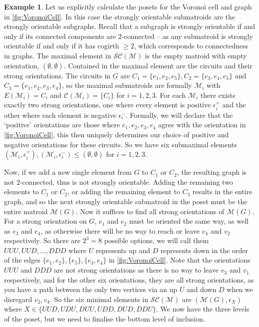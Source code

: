 \documentclass[12pt]{report}
\theoremstyle{definition}
\newtheorem{example}[theorem]{Example}
\def\calC{\mathcal C}
\def\calM{\mathcal M}
\def\calS{\mathcal S}
\theoremstyle{upright}
\begin{document}
\begin{example}

    Let us explicitly calculate the posets for the Voronoi cell and graph in \cref{fig:VoronoiCell}.
    In this case the strongly orientable submatroids are the strongly orientable subgraphs.
    Recall that a subgraph is strongly orientable if and only if its connected components are 2-connected -- as any submatroid is strongly orientable if and only if it has cogirth $\geq2$, which corresponds to connectedness in graphs.
    The maximal element in $\calS\calC(\calM)$ is the empty matroid with empty orientation, $(\emptyset, \emptyset)$.
    Contained in the maximal element are the circuits and their strong orientations.
    The circuits in $G$ are $C_1=\{e_1, e_2, e_5\}, C_2=\{e_3, e_4, e_5\}$ and $C_3=\{e_1, e_2, e_3, e_4\}$, so the maximal submatroids are formally $\calM_i$ with $E(\calM_i)=C_i$ and $\calC(\calM_i)=\{C_i\}$ for $i=1, 2, 3$.
    For each $\calM_i$ there exists exactly two strong orientations, one where every element is positive $\epsilon_i^+$ and the other where each element is negative $\epsilon_i^-$.
    Formally, we will declare that the `positive' orientations are those where $e_1, e_2, e_3, e_4$ agree with the orientation in \cref{fig:VoronoiCell}, this then uniquely determines our choice of positive and negative orientations for these circuits.
    So we have six submaximal elements $(\calM_i, \epsilon_i^+), (\calM_i, \epsilon_i^-)\leq(\emptyset, \emptyset)$ for $i=1, 2, 3$.

    Now, if we add a new single element from $G$ to $C_1$ or $C_2$, the resulting graph is not 2-connected, thus is not strongly orientable.
    Adding the remaining two elements to $C_1$ or $C_2$, or adding the remaining element to $C_3$ results in the entire graph, and so the next strongly orientable submatroid in the poset must be the entire matroid $\calM(G)$.
    Now it suffices to find all strong orientations of $\calM(G)$.
    For a strong orientation on $G$, $e_1$ and $e_2$ must be oriented the same way, as well as $e_3$ and $e_4$, as otherwise there will be no way to reach or leave $v_4$ and $v_2$ respectively.
    So there are $2^3=8$ possible options, we will call them $UUU, UUD, \dots, DDD$ where $U$ represents up and $D$ represents down in the order of the edges $\{e_1, e_2\}, \{e_5\}, \{e_3, e_4\}$ in \cref{fig:VoronoiCell}.
    Note that the orientations $UUU$ and $DDD$ are not strong orientations as there is no way to leave $v_3$ and $v_1$ respectively, and for the other six orientations, they are all strong orientations, as you have a path between the only two vertices via an up $U$ and down $D$ when we disregard $v_2, v_4$.
    So the six minimal elements in $\calS\calC(\calM)$ are $(\calM(G), \epsilon_X)$ where $X\in\{UUD, UDU, DUU, UDD, DUD, DDU\}$.
    We now have the three levels of the poset, but we need to finalise the bottom level of inclusion.


\end{example}
\end{document}
